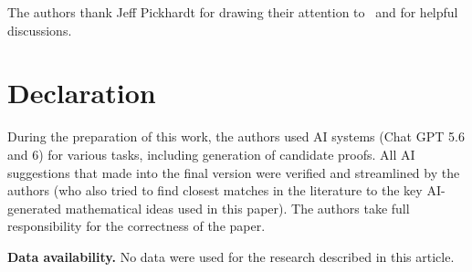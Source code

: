 \documentclass[12pt,a4paper]{article}
\numberwithin{equation}{section}
\theoremstyle{definition}
\theoremstyle{remark}
\begin{document}
The authors thank Jeff Pickhardt for drawing their attention to~\cite{Pickhardt26} and for helpful discussions.


\section*{Declaration}
During the preparation of this work, the authors used AI systems (Chat GPT 5.6 and 6) for various tasks, including generation of candidate
proofs. All AI
suggestions that made into the final version were verified and streamlined by the authors (who also tried to find closest matches in the literature to the key AI-generated mathematical ideas used in this paper). The authors take full responsibility for the correctness of the paper.


\smallskip
\noindent\textbf{Data availability.} No data were used for the research described in this article.





%
\end{document}
